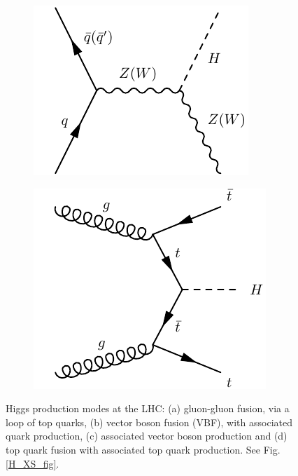 \documentclass[10pt]{article}
\begin{document}
\begin{figure}[h!]
\begin{subfigure}[b]{0.245\textwidth}
\includegraphics[width=\textwidth]{"HiggsProduction/wzH"}
\caption{}
\end{subfigure}
    \begin{subfigure}[b]{0.245\textwidth}
\includegraphics[width=\textwidth]{"HiggsProduction/ttH"}
\caption{}
\end{subfigure}
\caption{Higgs production modes at the LHC: (a) gluon-gluon fusion, via a loop of top quarks, (b) vector boson fusion (VBF), with associated quark production, (c) associated vector boson production and (d) top quark fusion with associated top quark production. See Fig. \ref{H_XS_fig}.}
\label{higgs_prod}
\end{figure}
\end{document}
